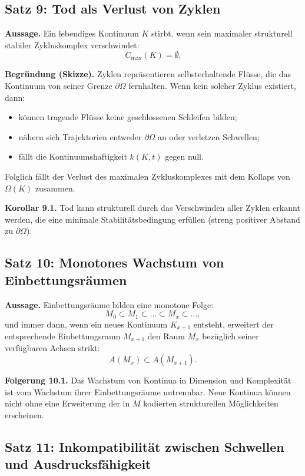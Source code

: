 \subsection{Satz 9: Tod als Verlust von Zyklen}

\textbf{Aussage.}
Ein lebendiges Kontinuum \(K\) stirbt, wenn sein maximaler strukturell stabiler Zykluskomplex verschwindet:
\[
    C_{\max}(K) = \emptyset.
\]

\textbf{Begründung (Skizze).}
Zyklen repräsentieren selbsterhaltende Flüsse, die das Kontinuum von seiner Grenze \(\partial\Omega\) fernhalten.
Wenn kein solcher Zyklus existiert, dann:
\begin{itemize}
    \item können tragende Flüsse keine geschlossenen Schleifen bilden;
    \item nähern sich Trajektorien entweder \(\partial\Omega\) an oder verletzen Schwellen;
    \item fällt die Kontinuumshaftigkeit \(k(K,t)\) gegen null.
\end{itemize}
Folglich fällt der Verlust des maximalen Zykluskomplexes mit dem Kollaps von \(\Omega(K)\) zusammen.

\textbf{Korollar 9.1.}
Tod kann strukturell durch das Verschwinden aller Zyklen erkannt werden, die eine minimale Stabilitätsbedingung erfüllen (streng positiver Abstand zu \(\partial\Omega\)).

\subsection{Satz 10: Monotones Wachstum von Einbettungsräumen}

\textbf{Aussage.}
Einbettungsräume bilden eine monotone Folge:
\[
    M_0 \subset M_1 \subset \dots \subset M_x \subset \dots,
\]
und immer dann, wenn ein neues Kontinuum \(K_{x+1}\) entsteht, erweitert der entsprechende Einbettungsraum \(M_{x+1}\) den Raum \(M_x\) bezüglich seiner verfügbaren Achsen strikt:
\[
    A(M_{x}) \subset A(M_{x+1}).
\]

\textbf{Folgerung 10.1.}
Das Wachstum von Kontinua in Dimension und Komplexität ist vom Wachstum ihrer Einbettungsräume untrennbar.
Neue Kontinua können nicht ohne eine Erweiterung der in \(M\) kodierten strukturellen Möglichkeiten erscheinen.

\subsection{Satz 11: Inkompatibilität zwischen Schwellen und Ausdrucksfähigkeit}

